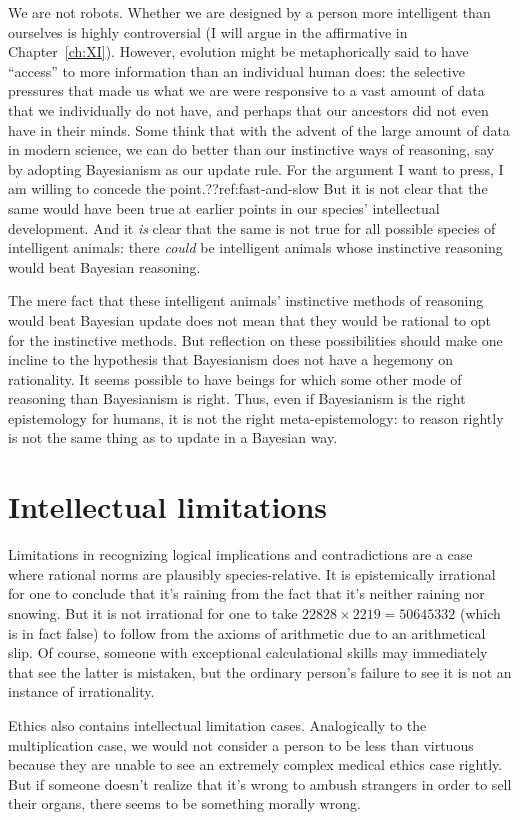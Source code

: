 We are not robots. Whether we are designed by a person more intelligent than ourselves is highly controversial (I will 
argue in the affirmative in Chapter~\ref{ch:XI}). However, evolution might be metaphorically said to have ``access'' to more 
information than an individual human does: the selective pressures that made us what we are were responsive to a vast amount
of data that we individually do not have, and perhaps that our ancestors did not even have in their minds. Some think 
that with the advent of the large amount of data in modern science, we can do 
better than our instinctive ways of reasoning, say by adopting Bayesianism as our update rule. For the argument I want 
to press, I am willing to concede the point.??ref:fast-and-slow But it is not clear that the same would have been true at earlier points in our species' intellectual development. And it \textit{is} clear that the same is not true for all possible species 
of intelligent animals: there \textit{could} be intelligent animals whose instinctive reasoning would beat Bayesian
reasoning. 

The mere fact that these intelligent animals' instinctive methods of reasoning would beat Bayesian update does not mean that they would be rational to opt for the instinctive methods. But reflection on these possibilities should make one incline to 
the hypothesis that Bayesianism does not have a hegemony on rationality. It seems possible to have beings for which some
other mode of reasoning than Bayesianism is right. Thus, even if Bayesianism is the right epistemology for humans,
it is not the right meta-epistemology: to reason rightly is not the same thing as to update in a Bayesian way. 

\section{Intellectual limitations}
Limitations in recognizing logical implications and contradictions are a case where rational norms are plausibly
species-relative. It is epistemically irrational for one to conclude that it's raining from the fact that it's neither 
raining nor snowing. But it is not irrational for one to take $22828 \times 2219 = 50645332$ (which is in fact
false) to follow from the axioms of arithmetic due to an arithmetical slip. Of course, someone with 
exceptional calculational skills may immediately that see the latter is mistaken, but the ordinary person's failure to see it is 
not an instance of irrationality. 

Ethics also contains intellectual limitation cases. Analogically to the multiplication
case, we would not consider a person to be less than virtuous because they are unable to see an extremely complex medical 
ethics case rightly. But if someone doesn't realize that it's wrong to ambush strangers in order to sell their organs,
there seems to be something morally wrong.

